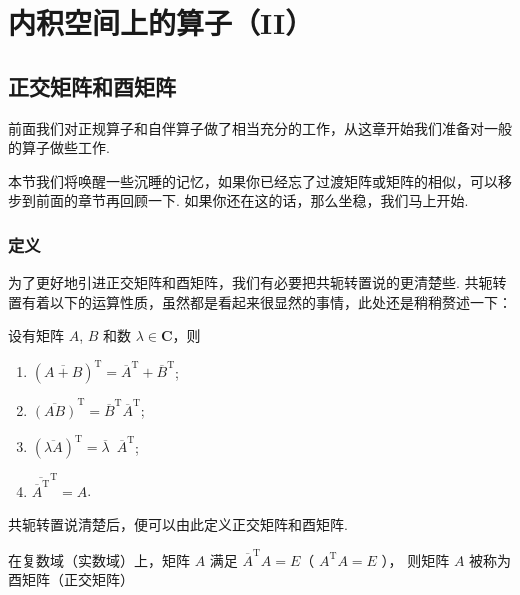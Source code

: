 \chapter{内积空间上的算子（II）}

\section{正交矩阵和酉矩阵}

前面我们对正规算子和自伴算子做了相当充分的工作，从这章开始我们准备对一般的算子做些工作. 

本节我们将唤醒一些沉睡的记忆，如果你已经忘了过渡矩阵或矩阵的相似，可以移步到前面的章节再回顾一下. 如果你还在这的话，那么坐稳，我们马上开始. 

\vspace{2ex}

\subsection{定义}

为了更好地引进正交矩阵和酉矩阵，我们有必要把共轭转置说的更清楚些. 
共轭转置有着以下的运算性质，虽然都是看起来很显然的事情，此处还是稍稍赘述一下：

设有矩阵 $ A $, $ B $ 和数 $ \lambda \in \mathbf{C}$，则

\begin{enumerate}    
    \item $ (\overline{A + B})^{\mathrm{T}} = \overline{A}^{\mathrm{T}} + \overline{B}^{\mathrm{T}} $;
    
    \item $ \overline{(AB)}^{\mathrm{T}} = \overline{B}^{\mathrm{T}} \overline{A}^{\mathrm{T}} $;
    
    \item $ (\overline{\lambda A})^{\mathrm{T}} = \overline{\lambda} \enspace \overline{A}^{\mathrm{T}} $;
    
    \item $ \overline{\overline{A}^{\mathrm{T}}}^{\mathrm{T}} = A $. 
\end{enumerate}

共轭转置说清楚后，便可以由此定义正交矩阵和酉矩阵. 

\begin{definition}   
    在复数域（实数域）上，矩阵 $ A $ 满足 $ \overline{A}^{\mathrm{T}} A = E $（ $ {A}^{\mathrm{T}} A = E $ ），
    则矩阵 $ A $ 被称为酉矩阵（正交矩阵） 
\end{definition}

